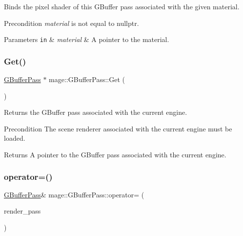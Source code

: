 Binds the pixel shader of this G\+Buffer pass associated with the given material.

\begin{DoxyPrecond}{Precondition}
{\itshape material} is not equal to {\ttfamily nullptr}. 
\end{DoxyPrecond}

\begin{DoxyParams}[1]{Parameters}
\mbox{\tt in}  & {\em material} & A pointer to the material. \\
\hline
\end{DoxyParams}
\hypertarget{classmage_1_1_g_buffer_pass_ab2a50a7bde900978153badaa49cf047c}{}\label{classmage_1_1_g_buffer_pass_ab2a50a7bde900978153badaa49cf047c} 
\subsubsection{\texorpdfstring{Get()}{Get()}}
{\footnotesize\ttfamily \hyperlink{classmage_1_1_g_buffer_pass}{G\+Buffer\+Pass} $\ast$ mage\+::\+G\+Buffer\+Pass\+::\+Get (\begin{DoxyParamCaption}{ }\end{DoxyParamCaption})\hspace{0.3cm}{\ttfamily [static]}}

Returns the G\+Buffer pass associated with the current engine.

\begin{DoxyPrecond}{Precondition}
The scene renderer associated with the current engine must be loaded. 
\end{DoxyPrecond}
\begin{DoxyReturn}{Returns}
A pointer to the G\+Buffer pass associated with the current engine. 
\end{DoxyReturn}
\hypertarget{classmage_1_1_g_buffer_pass_a79468fb8b4547197315c0aabbabffa71}{}\label{classmage_1_1_g_buffer_pass_a79468fb8b4547197315c0aabbabffa71} 
\subsubsection{\texorpdfstring{operator=()}{operator=()}\hspace{0.1cm}{\footnotesize\ttfamily [1/2]}}
{\footnotesize\ttfamily \hyperlink{classmage_1_1_g_buffer_pass}{G\+Buffer\+Pass}\& mage\+::\+G\+Buffer\+Pass\+::operator= (\begin{DoxyParamCaption}\item[{const \hyperlink{classmage_1_1_g_buffer_pass}{G\+Buffer\+Pass} \&}]{render\+\_\+pass }\end{DoxyParamCaption})\hspace{0.3cm}{\ttfamily [delete]}}

